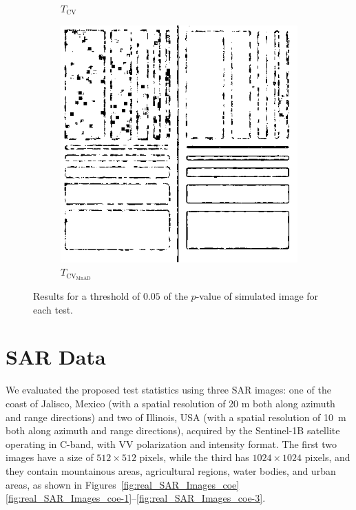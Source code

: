\begin{figure}[H]
\begin{subfigure}[b]{0.3\textwidth}
    \caption{$T_\text{CV}$}
    \label{fig:sim_SAR_Images_p05-2}
  \end{subfigure}
  \hfill
  \begin{subfigure}[b]{0.3\textwidth}
    \centering
    \includegraphics[width=\textwidth]{../../Figures/PNG/mnad_005_Phantom_7_z1}
     \caption{$T_{\text{CV}_{\text{MnAD}}}$}
    \label{fig:sim_SAR_Images_p05-3}
  \end{subfigure}
  \caption{Results for a threshold of $0.05$ of the $p$-value of simulated image for each test. }
  \label{fig:sim_SAR_Images_p05}
\end{figure}




\section{SAR Data}\label{sar-data}

We evaluated the proposed test statistics using three SAR images: one of
the coast of Jalisco, Mexico (with a spatial resolution of 20 m both
along azimuth and range directions) and two of Illinois, USA (with a
spatial resolution of \SI{10}{\meter} both along azimuth and range
directions), acquired by the Sentinel-1B satellite operating in C-band,
with VV polarization and intensity format. 
The first two images have a size of \(512 \times 512\) pixels, while the third has
\(1024 \times 1024\) pixels, and they contain mountainous areas,
agricultural regions, water bodies, and urban areas, as shown in
Figures~\ref{fig:real_SAR_Images_coe} \ref{fig:real_SAR_Images_coe-1}--\ref{fig:real_SAR_Images_coe-3}.

